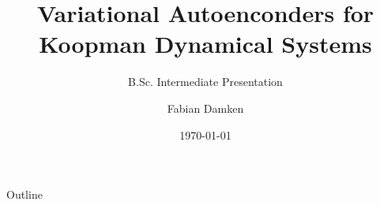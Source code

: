 \documentclass[
	aspectratio=43,
	color={accentcolor=1c},
	logo=false,
	colorframetitle=true,
]{tudabeamer}
\title{Variational Autoenconders for Koopman Dynamical Systems}
\subtitle{B.Sc. Intermediate Presentation}
\author{Fabian Damken}
\institute{Intelligent Autonomous Systems}
\date{\today}
\begin{document}
	\maketitle

	\begin{frame}{Outline}
		\tableofcontents
	\end{frame}

\end{document}
